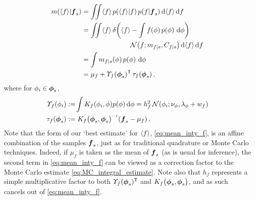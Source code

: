 \documentclass{article}
\begin{document}
\begin{align} \label{eq:mean_inty_f}
\mean{\inty{f}}{\vf_s}
& 
=\iint \inty{f}\,\p{\inty{f}}{f}\p{f}{\vf_s} \ud \inty{f} \,\ud f                                                                                                                                                               \nonumber\\
&
 =\iint \inty{f}\,\dd{\inty{f}}{\int f(\phi)\,\po{\phi}\,\ud\phi}
\nonumber\\
&\hspace{2.5cm}
\N{f}{\meancondfn{f}{s}}{\covcondfn{f}{s}} \ud \inty{f} \,\ud f \nonumber\\
&
 = \int \meancondfn{f}{s}(\phi)\,\po{\phi}\,\ud\phi\nonumber\\
&
 = 
\mu_f + \ntT{s}{f}\, \dtt{s}{f}
\,,
\end{align}
where for $\phi_i \in \vph_s$,
\begin{align*}
\fnt{\phi_i}{f} & \deq \!\int K_f(\phi_i,\phi)\po{\phi}\ud\phi
 = h_f^2\,\N{\phi_i}{\nu_{\phi}}{\lambda_{\phi}+w_{f}}\\
\dtt{s}{f} & \deq K_{f}\bigl(\vph_s,\vph_s\bigr)\inv (\vf_s-{\mu}_{f})\,.
\end{align*}
Note that the form of our `best estimate' for $\inty{f}$, \eqref{eq:mean_inty_f}, is an affine combination of the samples $\vf_s$, just as for traditional quadrature or Monte Carlo techniques. Indeed, if $\mu_f$ is taken as the mean of $\vf_s$ (as is usual for \gpb inference), the second term in \eqref{eq:mean_inty_f} can be viewed as a correction factor to the Monte Carlo estimate \eqref{eq:MC_integral_estimate}.
Note also that $h_f$ represents a simple multiplicative factor to both $\ntT{s}{f}$ and $K_{f}\bigl(\vph_s,\vph_s\bigr)$, and as such cancels out of \eqref{eq:mean_inty_f}. 
\end{document}
